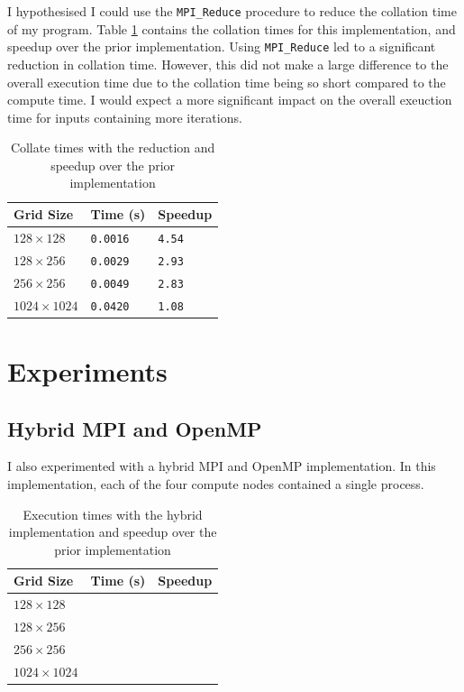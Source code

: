 \documentclass[twocolumn, a4paper]{article}
\begin{document}
I hypothesised I could use the \texttt{MPI\_Reduce} procedure to reduce the collation time of my program.
Table \ref{tab:reduction} contains the collation times for this implementation, and speedup over the prior implementation.
Using \texttt{MPI\_Reduce} led to a significant reduction in collation time.
However, this did not make a large difference to the overall execution time due to the collation time being so short compared to the compute time.
I would expect a more significant impact on the overall exeuction time for inputs containing more iterations.

\begin{table}[htbp]
  \begin{center}
  \caption{Collate times with the reduction and speedup over the prior implementation}\label{tab:reduction}
  \begin{tabular}[t]{l | l l} 
      \hline\hline
      Grid Size&Time (s)&Speedup\\
      \hline
      $128 \times 128$&\texttt{0.0016}&\texttt{4.54}\\
      $128 \times 256$&\texttt{0.0029}&\texttt{2.93}\\
      $256 \times 256$&\texttt{0.0049}&\texttt{2.83}\\
      $1024 \times 1024$&\texttt{0.0420}&\texttt{1.08}\\
      \hline
    \end{tabular}
  \end{center}
\end{table}

\section{Experiments}

\subsection{Hybrid MPI and OpenMP}

I also experimented with a hybrid MPI and OpenMP implementation.
In this implementation, each of the four compute nodes contained a single process.

\begin{table}[htbp]
  \begin{center}
  \caption{Execution times with the hybrid implementation and speedup over the prior implementation}\label{tab:hybrid}
  \begin{tabular}[t]{l | l l} 
      \hline\hline
      Grid Size&Time (s)&Speedup\\
      \hline
      $128 \times 128$&\texttt{}&\texttt{}\\
      $128 \times 256$&\texttt{}&\texttt{}\\
      $256 \times 256$&\texttt{}&\texttt{}\\
      $1024 \times 1024$&\texttt{}&\texttt{}\\
      \hline
    \end{tabular}
  \end{center}
\end{table}
\end{document}
